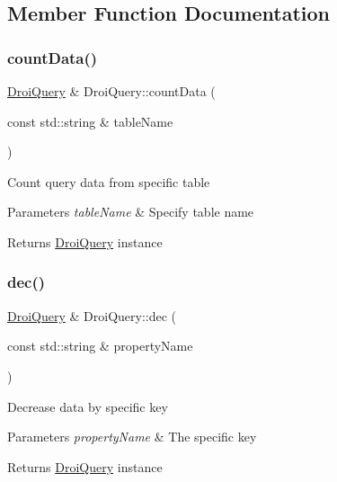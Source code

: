\subsection{Member Function Documentation}
\mbox{\label{class_droi_query_a8a5dbfc1165c6794180bbe45e0ede93d}} 
\subsubsection{\texorpdfstring{count\+Data()}{countData()}}
{\footnotesize\ttfamily \hyperlink{class_droi_query}{Droi\+Query} \& Droi\+Query\+::count\+Data (\begin{DoxyParamCaption}\item[{const std\+::string \&}]{table\+Name }\end{DoxyParamCaption})}

Count query data from specific table 
\begin{DoxyParams}{Parameters}
{\em table\+Name} & Specify table name \\
\hline
\end{DoxyParams}
\begin{DoxyReturn}{Returns}
\hyperlink{class_droi_query}{Droi\+Query} instance 
\end{DoxyReturn}
\mbox{\label{class_droi_query_aded6970870832e609925139c4f61405e}} 
\subsubsection{\texorpdfstring{dec()}{dec()}}
{\footnotesize\ttfamily \hyperlink{class_droi_query}{Droi\+Query} \& Droi\+Query\+::dec (\begin{DoxyParamCaption}\item[{const std\+::string \&}]{property\+Name }\end{DoxyParamCaption})}

Decrease data by specific key 
\begin{DoxyParams}{Parameters}
{\em property\+Name} & The specific key \\
\hline
\end{DoxyParams}
\begin{DoxyReturn}{Returns}
\hyperlink{class_droi_query}{Droi\+Query} instance 
\end{DoxyReturn}
\mbox{\label{class_droi_query_af7084bfa46a759fd3da97e039c478c75}} 
